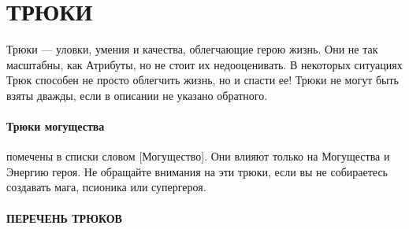 \section{ТРЮКИ}
Трюки — уловки, умения и качества, облегчающие герою жизнь. Они не так масштабны, как Атрибуты, но не стоит их недооценивать. В некоторых ситуациях Трюк способен не просто облегчить жизнь, но и спасти ее! Трюки не могут быть взяты дважды, если в описании не указано обратного.
\paragraph{Трюки могущества} помечены в списки словом [Могущество]. Они влияют только на Могущества и Энергию героя. Не обращайте внимания на эти трюки, если вы не собираетесь создавать мага, псионика или супергероя.

\paragraph{ПЕРЕЧЕНЬ ТРЮКОВ}
